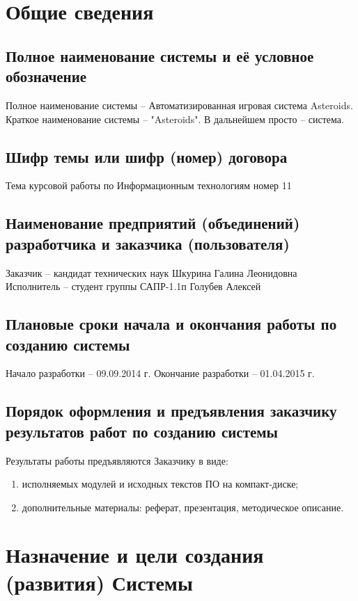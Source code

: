 \chapter{Общие сведения}
\section{Полное наименование системы и её условное обозначение}
Полное наименование системы -- Автоматизированная игровая система Asteroids.
Краткое наименование системы -- "Asteroids". В дальнейшем просто -- система.

\section{Шифр темы или шифр (номер) договора}
Тема курсовой работы по Информационным технологиям номер 11

\section{Наименование предприятий (объединений) разработчика и заказчика (пользователя)}
Заказчик -- кандидат технических наук Шкурина Галина Леонидовна\\
Исполнитель -- студент группы САПР-1.1п Голубев Алексей

\section{Плановые сроки начала и окончания работы по созданию системы}
Начало разработки -- 09.09.2014 г. Окончание разработки -- 01.04.2015 г.

\section{Порядок оформления и предъявления заказчику результатов работ по созданию системы}
Результаты работы предъявляются Заказчику в виде:
\begin{enumerate}
    \item исполняемых модулей и исходных текстов ПО на компакт-диске;
    \item дополнительные материалы: реферат, презентация, методическое описание.
\end{enumerate}

\chapter{Назначение и цели создания (развития) Системы}
